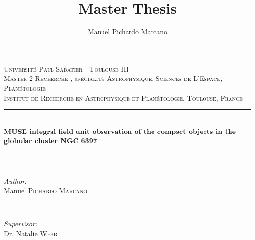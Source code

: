 \documentclass[11pt,a4paper,twoside]{report}
\author{Manuel Pichardo Marcano}
\title{Master Thesis}
\begin{document}
\begin{titlepage}

\newcommand{\HRule}{\rule{\linewidth}{0.5mm}} %

\center %
 

\textsc{\LARGE Universit\'e Paul Sabatier -  Toulouse III}\\[1.5cm] %
\textsc{\large Master 2 Recherche , sp\'ecialit\'e Astrophysique, Sciences de L’Espace, Plan\'etologie}\\[0.5cm] %
\textsc{\large Institut de Recherche en Astrophysique et Planétologie, Toulouse, France}\\[0.5cm] %

\HRule \\[0.4cm]
{ \huge \bfseries MUSE integral field unit observation of the compact objects in the globular cluster NGC 6397}\\[0.4cm] %
\HRule \\[1.5cm]
 

\begin{minipage}{0.4\textwidth}
\begin{flushleft} \large
\emph{Author:}\\
Manuel \textsc{Pichardo Marcano} %
\end{flushleft}
\end{minipage}
~
\begin{minipage}{0.4\textwidth}
\begin{flushright} \large
\emph{Supervisor:} \\
Dr. Natalie \textsc{Webb} %
\end{flushright}
\end{minipage}\\[4cm]


\end{titlepage}
\end{document}
